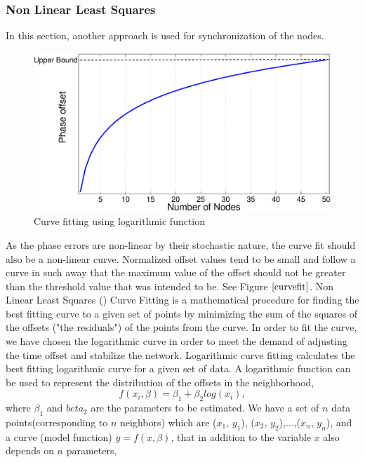 \documentclass[a4paper,10pt]{report}
\begin{document}
\subsubsection{Non Linear Least Squares}
In this section, another approach is used for synchronization of the nodes.
\newline
\begin{figure}
\centering
\includegraphics[width=0.75 \textwidth]{curvefit}
\caption{Curve fitting using logarithmic function} \label{curvefit}
\end{figure}
As the phase errors are non-linear by their stochastic nature, the curve fit should also be a non-linear curve. Normalized offset values tend to be small and follow a curve in such away that the maximum value of the offset should not be greater than the threshold value that was intended to be. See Figure $\ref{curvefit}$. 
\newline
Non Linear Least Squares () Curve Fitting  is a mathematical procedure for finding the best fitting curve to a given set of points by minimizing the sum of the squares of the offsets ("the residuals") of the points from the curve. In order to fit the curve, we have chosen the logarithmic curve in order to meet the demand of adjusting the time offset and stabilize the network. Logarithmic
curve fitting calculates the best fitting logarithmic curve for a given set of data. A logarithmic function can be used to represent
the distribution of the offsets in the neighborhood, 
\begin{equation}
 f(x_i,\beta)= \beta _1 + \beta_2log(x_i),
\end{equation}
where $\beta_1$ and $beta_2$ are the parameters to be estimated.\newline
We have a set of $n$ data points(corresponding to $n$ neighbors) which are ($x_1$, $y_1$), ($x_2$, $y_2$),$\dots$,($x_n$, $y_n$), and a curve (model function) $y= f(x, \beta)$, that in addition to the variable $x$ also depends on $n$ parameters,
\end{document}
